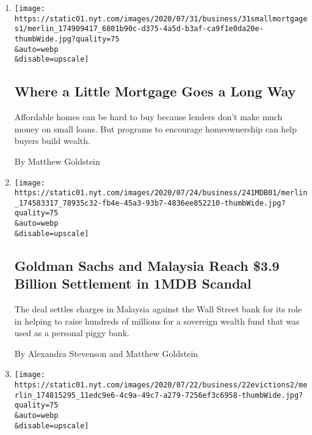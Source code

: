 \begin{enumerate}
\def\labelenumi{\arabic{enumi}.}
\item
  \href{/2020/08/02/business/mortgages-affordable-housing.html}{}

  \texttt{[image: https://static01.nyt.com/images/2020/07/31/business/31smallmortgages1/merlin\_174909417\_6801b90c-d375-4a5d-b3af-ca9f1e0da20e-thumbWide.jpg?quality=75\\\&auto=webp\\\&disable=upscale]}

  \hypertarget{where-a-little-mortgage-goes-a-long-way}{%
  \subsection{Where a Little Mortgage Goes a Long
  Way}\label{where-a-little-mortgage-goes-a-long-way}}

  Affordable homes can be hard to buy because lenders don't make much
  money on small loans. But programs to encourage homeownership can help
  buyers build wealth.

  By Matthew Goldstein
\item
  \href{/2020/07/24/business/goldman-sachs-malaysia-1mdb.html}{}

  \texttt{[image: https://static01.nyt.com/images/2020/07/24/business/241MDB01/merlin\_174583317\_78935c32-fb4e-45a3-93b7-4836ee852210-thumbWide.jpg?quality=75\\\&auto=webp\\\&disable=upscale]}

  \hypertarget{goldman-sachs-and-malaysia-reach-39-billion-settlement-in-1mdb-scandal}{%
  \subsection{Goldman Sachs and Malaysia Reach \$3.9 Billion Settlement
  in 1MDB
  Scandal}\label{goldman-sachs-and-malaysia-reach-39-billion-settlement-in-1mdb-scandal}}

  The deal settles charges in Malaysia against the Wall Street bank for
  its role in helping to raise hundreds of millions for a sovereign
  wealth fund that was used as a personal piggy bank.

  By Alexandra Stevenson and Matthew Goldstein
\item
  \href{/2020/07/23/business/evictions-moratorium-cares-act.html}{}

  \texttt{[image: https://static01.nyt.com/images/2020/07/22/business/22evictions2/merlin\_174815295\_11edc9e6-4c9a-49c7-a279-7256ef3c6958-thumbWide.jpg?quality=75\\\&auto=webp\\\&disable=upscale]}

  \hypertarget{landlords-jump-the-gun-as-eviction-moratorium-wanes}{%
}
\end{enumerate}
